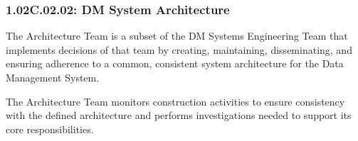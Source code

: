 \subsubsection*{1.02C.02.02: DM System Architecture}

The Architecture Team is a subset of the DM Systems Engineering Team that implements decisions of that team by creating, maintaining, disseminating, and ensuring adherence to a common, consistent system architecture for the Data Management System.

The Architecture Team monitors construction activities to ensure consistency with the defined architecture and performs investigations needed to support its core responsibilities.
